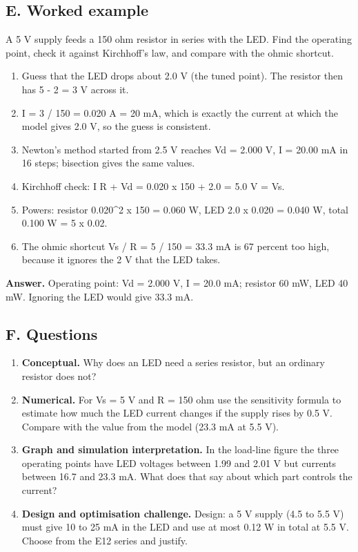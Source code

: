 \documentclass[11pt,a4paper]{article}
\begin{document}
\subsection*{E. Worked example}
A 5 V supply feeds a 150 ohm resistor in series with the LED. Find the operating point, check it against Kirchhoff's law, and compare with the ohmic shortcut.
\begin{enumerate}[nosep]
\item Guess that the LED drops about 2.0 V (the tuned point). The resistor then has 5 - 2 = 3 V across it.
\item I = 3 / 150 = 0.020 A = 20 mA, which is exactly the current at which the model gives 2.0 V, so the guess is consistent.
\item Newton's method started from 2.5 V reaches Vd = 2.000 V, I = 20.00 mA in 16 steps; bisection gives the same values.
\item Kirchhoff check: I R + Vd = 0.020 x 150 + 2.0 = 5.0 V = Vs.
\item Powers: resistor 0.020\textasciicircum{}2 x 150 = 0.060 W, LED 2.0 x 0.020 = 0.040 W, total 0.100 W = 5 x 0.02.
\item The ohmic shortcut Vs / R = 5 / 150 = 33.3 mA is 67 percent too high, because it ignores the 2 V that the LED takes.
\end{enumerate}
\textbf{Answer.} Operating point: Vd = 2.000 V, I = 20.0 mA; resistor 60 mW, LED 40 mW. Ignoring the LED would give 33.3 mA.

\subsection*{F. Questions}
\begin{enumerate}[nosep]
\item \textbf{Conceptual.} Why does an LED need a series resistor, but an ordinary resistor does not?
\item \textbf{Numerical.} For Vs = 5 V and R = 150 ohm use the sensitivity formula to estimate how much the LED current changes if the supply rises by 0.5 V. Compare with the value from the model (23.3 mA at 5.5 V).
\item \textbf{Graph and simulation interpretation.} In the load-line figure the three operating points have LED voltages between 1.99 and 2.01 V but currents between 16.7 and 23.3 mA. What does that say about which part controls the current?
\item \textbf{Design and optimisation challenge.} Design: a 5 V supply (4.5 to 5.5 V) must give 10 to 25 mA in the LED and use at most 0.12 W in total at 5.5 V. Choose from the E12 series and justify.
\end{enumerate}
\end{document}

